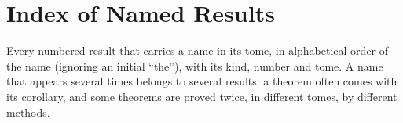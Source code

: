 \chapter{Index of Named Results}\label{ch:index}

Every numbered result that carries a name in its tome, in alphabetical order of the name (ignoring an initial
``the''), with its kind, number and tome. A name that appears several times belongs to several results: a theorem
often comes with its corollary, and some theorems are proved twice, in different tomes, by different methods.



